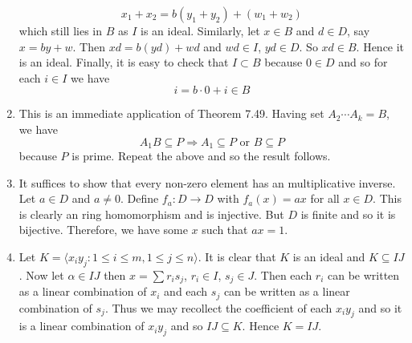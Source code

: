 \begin{enumerate}
    $$x_1+x_2=b(y_1+y_2)+(w_1+w_2)$$ which still lies in $B$ as $I$ is an ideal.
    Similarly, let $x \in B$ and $d \in D$, say $x=by+w$. Then $xd=b(yd)+wd$ and $wd \in I$, $yd \in D$. So $xd \in B$. Hence it is an ideal.
    Finally, it is easy to check that $I \subset B$ because $0 \in D$ and so for each $i \in I$ we have
    $$i=b \cdot 0 +i \in B$$
\item This is an immediate application of Theorem 7.49. Having set $A_2 \cdots A_k=B$, we have
$$A_1 B \subseteq P \Rightarrow A_1 \subseteq P \text{ or } B \subseteq P$$
    because $P$ is prime. Repeat the above and so the result follows.\\
\item It suffices to show that every non-zero element has an multiplicative inverse. Let $a \in D$ and $a \neq 0$. Define $f_a: D \rightarrow D$ with $f_a(x)=ax$ for all $x \in D$. This is clearly an ring homomorphism and is injective. But $D$ is finite and so it is bijective. Therefore, we have some $x$ such that $ax=1$.\\
\item Let $K=\langle x_i y_j: 1 \le i \le m, 1 \le j \le n \rangle$. It is clear that $K$ is an ideal and
$K \subseteq IJ$. Now let $\alpha \in IJ$ then $x=\sum r_i s_j$, $r_i \in I$, $s_j \in J$. Then each $r_i$ can be written as a linear combination of $x_i$ and each $s_j$ can be written as a linear combination of $s_j$. Thus we may recollect the coefficient of each $x_iy_j$ and so it is a linear combination of $x_iy_j$ and so $IJ \subseteq K$. Hence $K=IJ$.
\end{enumerate}
